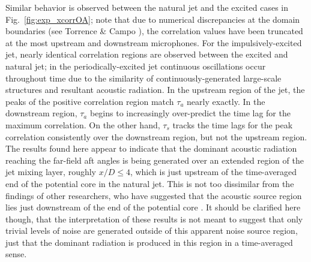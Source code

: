 \documentclass[english]{aiaa-tc}
\newcommand*{\fig}[1]{Fig.~\ref{#1}}
\begin{document}
Similar behavior is observed between the natural jet and the excited cases in \fig{fig:exp_xcorrOA}; note that due to numerical discrepancies at the domain boundaries (see Torrence \& Campo \cite{Torrence1998}), the correlation values have been truncated at the most upstream and downstream microphones.
For the impulsively-excited jet, nearly identical correlation regions are observed between the excited and natural jet; in the periodically-excited jet continuous oscillations occur throughout time due to the similarity of continuously-generated large-scale structures and resultant acoustic radiation.
In the upstream region of the jet, the peaks of the positive correlation region match $\tau_a$ nearly exactly. 
In the downstream region, $\tau_a$ begins to increasingly over-predict the time lag for the maximum correlation. 
On the other hand, $\tau_s$ tracks the time lags for the peak correlation consistently over the downstream region, but not the upstream region. 
The results found here appear to indicate that the dominant acoustic radiation reaching the far-field aft angles is being generated over an extended region of the jet mixing layer, roughly $x/D \leq 4$, which is just upstream of the time-averaged end of the potential core in the natural jet.
This is not too dissimilar from the findings of other researchers, who have suggested that the acoustic source region lies just downstream of the end of the potential core \cite{Hileman2005}.
It should be clarified here though, that the interpretation of these results is not meant to suggest that only trivial levels of noise are generated outside of this apparent noise source region, just that the dominant radiation is produced in this region in a time-averaged sense.
\end{document}
